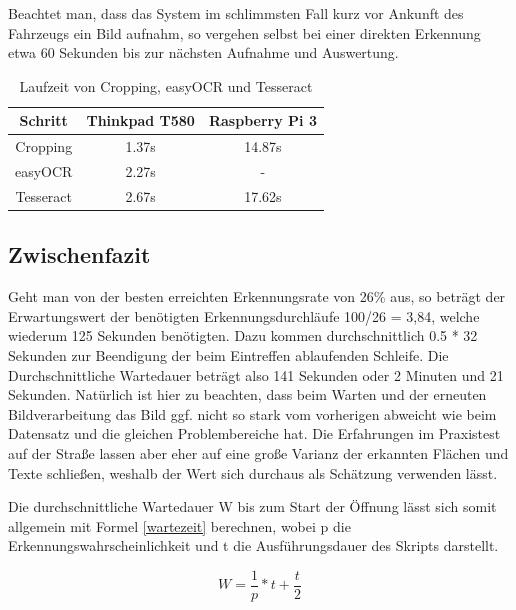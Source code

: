 Beachtet man, dass das System im schlimmsten Fall kurz vor Ankunft des Fahrzeugs ein Bild aufnahm, so vergehen selbst bei einer direkten Erkennung etwa 60 Sekunden bis zur nächsten Aufnahme und Auswertung. 

				
\begin{table}[h]
	\begin{center}
	\begin{tabular}{ c | c | c }
	
	Schritt & Thinkpad T580 & Raspberry Pi 3 \\
	\hline
	Cropping & 1.37s & 14.87s \\
	easyOCR & 2.27s & - \\
	Tesseract & 2.67s & 17.62s \\
	
	\end{tabular}
	\caption{Laufzeit von Cropping, easyOCR und Tesseract}
	\label{Tabelle:2}
	\end{center}
\end{table}			   
							 	   
\newpage
\subsection{Zwischenfazit}
Geht man von der besten erreichten Erkennungsrate von 26\% aus, so beträgt der Erwartungswert der benötigten Erkennungsdurchläufe 100/26 = 3,84, welche wiederum 125 Sekunden benötigten. Dazu kommen durchschnittlich 0.5 * 32 Sekunden zur Beendigung der beim Eintreffen ablaufenden Schleife. Die Durchschnittliche Wartedauer beträgt also 141 Sekunden oder 2 Minuten und 21 Sekunden. 
\newline Natürlich ist hier zu beachten, dass beim Warten und der erneuten Bildverarbeitung das Bild ggf. nicht so stark vom vorherigen abweicht wie beim Datensatz und die gleichen Problembereiche hat. Die Erfahrungen im Praxistest auf der Straße lassen aber eher auf eine große Varianz der erkannten Flächen und Texte schließen, weshalb der Wert sich durchaus als Schätzung verwenden lässt.

Die durchschnittliche Wartedauer W bis zum Start der Öffnung lässt sich somit allgemein mit  Formel \ref{wartezeit} berechnen, wobei p die Erkennungswahrscheinlichkeit und t die Ausführungsdauer des Skripts darstellt.

\begin{equation}
	W=\frac{1}{p} * t + \frac{t}{2}
\label{wartezeit}
\end{equation}